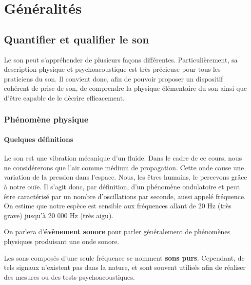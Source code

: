 \documentclass[
]{book}
\begin{document}
\hypertarget{part-guxe9nuxe9ralituxe9s}{%
\part{Généralités}\label{part-guxe9nuxe9ralituxe9s}}

\hypertarget{quantifier-et-qualifier-le-son}{%
\chapter{Quantifier et qualifier le son}\label{quantifier-et-qualifier-le-son}}

Le son peut s'appréhender de plusieurs façons différentes. Particulièrement, sa description physique et psychoacoustique est très précieuse pour tous les praticiens du son. Il convient donc, afin de pouvoir proposer un dispositif cohérent de prise de son, de comprendre la physique élémentaire du son ainsi que d'être capable de le décrire efficacement.

\hypertarget{phuxe9nomuxe8ne-physique}{%
\section{Phénomène physique}\label{phuxe9nomuxe8ne-physique}}

\hypertarget{quelques-duxe9finitions}{%
\subsection{Quelques définitions}\label{quelques-duxe9finitions}}

Le son est une vibration mécanique d'un fluide. Dans le cadre de ce cours, nous ne considérerons que l'air comme médium de propagation. Cette onde cause une variation de la pression dans l'espace. Nous, les êtres humains, le percevons grâce à notre ouïe. Il s'agit donc, par définition, d'un phénomène ondulatoire et peut être caractérisé par un nombre d'oscillations par seconde, aussi appelé fréquence. On estime que notre espèce est sensible aux fréquences allant de 20 Hz (très grave) jusqu'à 20 000 Hz (très aigu).

On parlera d'\textbf{évènement sonore} pour parler généralement de phénomènes physiques produisant une onde sonore.

Les sons composés d'une seule fréquence se nomment \textbf{sons purs}. Cependant, de tels signaux n'existent pas dans la nature, et sont souvent utilisés afin de réaliser des mesures ou des tests psychoacoustiques.
\end{document}
